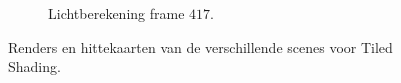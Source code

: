 \begin{figure}[t]
\begin{subfigure}[b]{0.35\textwidth}
    \caption{Lichtberekening frame $417$.}
    \label{fig:fds-test-frames-example:zc417lc}
  \end{subfigure}
  \caption{ Renders en hittekaarten van de verschillende scenes voor Tiled Shading.}
  \label{fig:fds-test-frames-example:zc}
\end{figure}

